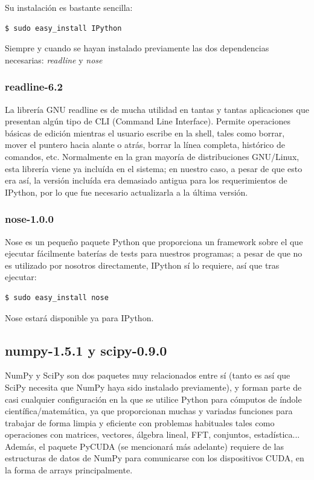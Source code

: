 \documentclass[twoside]{article}
\begin{document}
\vspace{5 mm}

Su instalación es bastante sencilla:

\begin{verbatim}
$ sudo easy_install IPython
\end{verbatim}

Siempre y cuando se hayan instalado previamente las dos dependencias necesarias: \emph{readline} y \emph{nose}

\subsubsection{readline-6.2}

La librería GNU readline es de mucha utilidad en tantas y tantas aplicaciones que presentan algún tipo de CLI (Command Line Interface). Permite operaciones básicas de edición mientras el usuario escribe en la shell, tales como borrar, mover el puntero hacia alante o atrás, borrar la línea completa, histórico de comandos, etc. Normalmente en la gran mayoría de distribuciones GNU/Linux, esta librería viene ya incluída en el sistema; en nuestro caso, a pesar de que esto era así, la versión incluída era demasiado antigua para los requerimientos de IPython, por lo que fue necesario actualizarla a la última versión.

\subsubsection{nose-1.0.0}

Nose es un pequeño paquete Python que proporciona un framework sobre el que ejecutar fácilmente baterías de tests para nuestros programas; a pesar de que no es utilizado por nosotros directamente, IPython sí lo requiere, así que tras ejecutar:

\begin{verbatim}
$ sudo easy_install nose
\end{verbatim}

Nose estará disponible ya para IPython.

\subsection{numpy-1.5.1 y scipy-0.9.0}
NumPy y SciPy son dos paquetes muy relacionados entre sí (tanto es así que SciPy necesita que NumPy haya sido instalado previamente), y forman parte de casi cualquier configuración en la que se utilice Python para cómputos de índole científica/matemática, ya que proporcionan muchas y variadas funciones para trabajar de forma limpia y eficiente con problemas habituales tales como operaciones con matrices, vectores, álgebra lineal, FFT, conjuntos, estadística... Además, el paquete PyCUDA (se mencionará más adelante) requiere de las estructuras de datos de NumPy para comunicarse con los dispositivos CUDA, en la forma de arrays principalmente.
\end{document}
